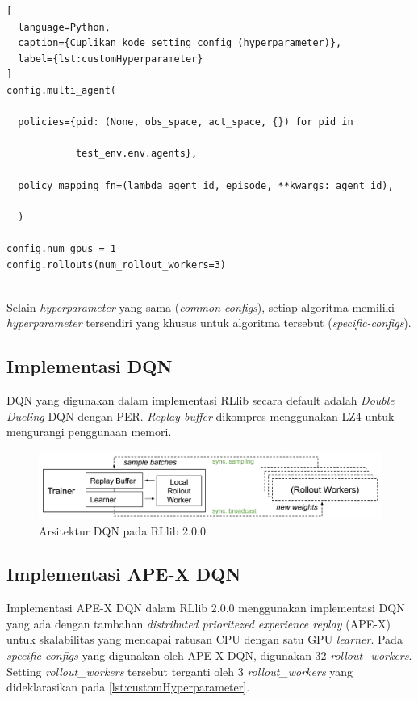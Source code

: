 \begin{lstlisting}[
  language=Python,
  caption={Cuplikan kode setting config (hyperparameter)},
  label={lst:customHyperparameter}
]
config.multi_agent(

  policies={pid: (None, obs_space, act_space, {}) for pid in

            test_env.env.agents},

  policy_mapping_fn=(lambda agent_id, episode, **kwargs: agent_id),

  )  

config.num_gpus = 1
config.rollouts(num_rollout_workers=3)
    
\end{lstlisting}

Selain \emph{hyperparameter} yang sama (\emph{common-configs}), setiap algoritma memiliki \emph{hyperparameter}
tersendiri yang khusus untuk algoritma tersebut (\emph{specific-configs}).

\subsection{Implementasi DQN}
DQN yang digunakan dalam implementasi RLlib secara default adalah \emph{Double Dueling} DQN
dengan PER. \emph{Replay buffer} dikompres menggunakan LZ4 untuk mengurangi penggunaan memori.

\begin{figure}[H]
  \centering
    \includegraphics[scale=0.6]{gambar/rllib_dqn_architecture.png}
    \caption{Arsitektur DQN pada RLlib 2.0.0 \citep{rllibDocumentation}}
    \label{fig:rllib_dqn_architecture}
\end{figure}

\subsection{Implementasi APE-X DQN}
Implementasi APE-X DQN dalam RLlib 2.0.0 menggunakan implementasi DQN yang ada dengan
tambahan \emph{distributed prioritezed experience replay} (APE-X) untuk skalabilitas
yang mencapai ratusan CPU dengan satu GPU \emph{learner}. Pada \emph{specific-configs}
yang digunakan oleh APE-X DQN, digunakan 32 \emph{rollout\_workers}. Setting \emph{rollout\_workers}
tersebut terganti oleh 3 \emph{rollout\_workers} yang dideklarasikan pada \ref{lst:customHyperparameter}.

